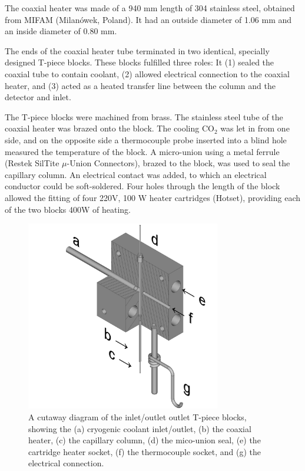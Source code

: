 \documentclass[aip,rsi,preprint,graphicx]{revtex4-1} %
\begin{document}
The coaxial heater was made of a 940 mm length of 304 stainless steel, obtained
from MIFAM (Milanówek, Poland). It had an outside diameter of 1.06 mm and an
inside diameter of 0.80 mm.

The ends of the coaxial heater tube terminated in two identical, specially
designed T-piece blocks. These blocks fulfilled three roles: It (1) sealed the
coaxial tube to contain coolant, (2) allowed electrical connection to the
coaxial heater, and (3) acted as a heated transfer line between the column and
the detector and inlet.

The T-piece blocks were machined from brass. The stainless steel tube of the
coaxial heater was brazed onto the block. The cooling CO$_2$ was let in from one
side, and on the opposite side a thermocouple probe inserted into a blind hole
measured the temperature of the block. A micro-union using a metal ferrule
(Restek\texttrademark{} SilTite $\mu$-Union Connectors), brazed to the block,
was used to seal the capillary column. An electrical contact was added, to which
an electrical conductor could be soft-soldered. Four holes through the length of
the block allowed the fitting of four 220V, 100 W heater cartridges (Hotset),
providing each of the two blocks 400W of heating.

\begin{figure}
	\includegraphics[width=8.5cm]{./Figures/Cutaway_with_symbols.png}
	\caption["The T-piece block"]{A cutaway diagram of the inlet/outlet outlet T-piece blocks, showing the (a) cryogenic coolant inlet/outlet, (b) the coaxial heater, (c) the capillary column, (d) the mico-union seal, (e) the cartridge heater socket, (f) the thermocouple socket, and (g) the electrical connection.}%
	\label{fig:Manifold}
\end{figure}
\end{document}

